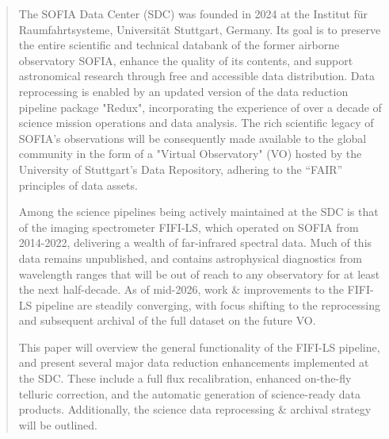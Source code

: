 \documentclass[11pt,twoside]{article}
\begin{document}


\begin{abstract}
The SOFIA Data Center (SDC) was founded in 2024 at the Institut f\"{u}r Raumfahrtsysteme,
Universit\"{a}t Stuttgart, Germany. Its goal is to preserve the entire scientific and
technical databank of the former airborne observatory SOFIA, enhance the quality of
its contents, and support astronomical research through free and accessible data
distribution. Data reprocessing is enabled by an updated version of the data reduction
pipeline package "Redux", incorporating the experience of over a decade of science
mission operations and data analysis. The rich scientific legacy of SOFIA's observations
will be consequently made available to the global community in the form of a
"Virtual Observatory" (VO) hosted by the University of Stuttgart's Data Repository,
adhering to the ``FAIR'' principles of data assets.

Among the science pipelines being actively maintained at the SDC is that of the
imaging spectrometer FIFI-LS, which operated on SOFIA from 2014-2022, delivering
a wealth of far-infrared spectral data. Much of this data remains unpublished,
and contains astrophysical diagnostics from wavelength ranges that will be out
of reach to any observatory for at least the next half-decade. As of mid-2026,
work \& improvements to the FIFI-LS pipeline are steadily converging, with focus
shifting to the reprocessing and subsequent archival of the full dataset on the
future VO.

This paper will overview the general functionality of the FIFI-LS pipeline, and
present several major data reduction enhancements implemented at the SDC. These
include a full flux recalibration, enhanced on-the-fly telluric correction, and
the automatic generation of science-ready data products. Additionally, the science
data reprocessing \& archival strategy will be outlined.
\end{abstract}


\end{document}
